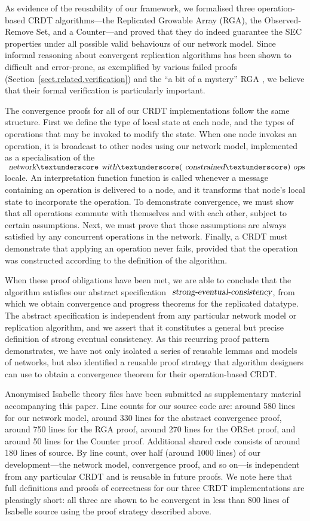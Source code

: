 \documentclass[acmlarge,review]{acmart}
\begin{document}
As evidence of the reusability of our framework, we formalised three operation-based CRDT algorithms---the Replicated Growable Array (RGA), the Observed-Remove Set, and a Counter---and proved that they do indeed guarantee the SEC properties under all possible valid behaviours of our network model.
Since informal reasoning about convergent replication algorithms has been shown to difficult and error-prone, as exemplified by various failed proofs (Section~\ref{sect.related.verification}) and the ``a bit of a mystery'' RGA \cite{Attiya:2016kh}, we believe that their formal verification is particularly important.

The convergence proofs for all of our CRDT implementations follow the same structure.
First we define the type of local state at each node, and the types of operations that may be invoked to modify the state.
When one node invokes an operation, it is broadcast to other nodes using our network model, implemented as a specialisation of the $\isa{network}{\isacharunderscore}\isa{with}{\isacharunderscore}(\isa{constrained}{\isacharunderscore})\isa{ops}$ locale.
An interpretation function function is called whenever a message containing an operation is delivered to a node, and it transforms that node's local state to incorporate the operation.
To demonstrate convergence, we must show that all operations commute with themselves and with each other, subject to certain assumptions.
Next, we must prove that those assumptions are always satisfied by any concurrent operations in the network.
Finally, a CRDT must demonstrate that applying an operation never fails, provided that the operation was constructed according to the definition of the algorithm.

When these proof obligations have been met, we are able to conclude that the algorithm satisfies our abstract specification $\isa{strong-eventual-consistency}$, from which we obtain convergence and progress theorems for the replicated datatype.
The abstract specification is independent from any particular network model or replication algorithm, and we assert that it constitutes a general but precise definition of strong eventual consistency.
As this recurring proof pattern demonstrates, we have not only isolated a series of reusable lemmas and models of networks, but also identified a reusable proof strategy that algorithm designers can use to obtain a convergence theorem for their operation-based CRDT.

Anonymised Isabelle theory files have been submitted as supplementary material accompanying this paper.
Line counts for our source code are: around 580 lines for our network model, around 330 lines for the abstract convergence proof, around 750 lines for the RGA proof, around 270 lines for the ORSet proof, and around 50 lines for the Counter proof.
Additional shared code consists of around 180 lines of source.
By line count, over half (around 1000 lines) of our development---the network model, convergence proof, and so on---is independent from any particular CRDT and is reusable in future proofs.
We note here that full definitions and proofs of correctness for our three CRDT implementations are pleasingly short: all three are shown to be convergent in less than 800 lines of Isabelle source using the proof strategy described above.
\end{document}
